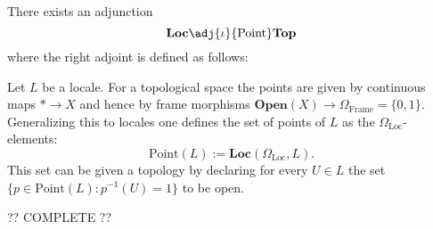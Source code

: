     \begin{construct}
        There exists an adjunction \[\textbf{Loc}\adj{\iota}{\text{Point}}\textbf{Top}\] where the right adjoint is defined as follows:

        \qquad Let $L$ be a locale. For a topological space the points are given by continuous maps $\ast\rightarrow X$ and hence by frame morphisms $\textbf{Open}(X)\rightarrow\Omega_{\text{Frame}}=\{0, 1\}$. Generalizing this to locales one defines the set of points of $L$ as the $\Omega_{\text{Loc}}$-elements: \[\text{Point}(L) := \textbf{Loc}(\Omega_{\text{Loc}}, L).\] This set can be given a topology by declaring for every $U\in L$ the set $\{p\in\text{Point}(L) : p^{-1}(U) = 1\}$ to be open.
    \end{construct}

    ?? COMPLETE ??